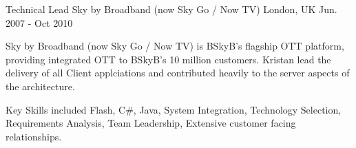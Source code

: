 \begin{cventries}

\cventry
{Technical Lead} %
{Sky by Broadband (now Sky Go / Now TV)} %
{London, UK} %
{Jun. 2007 - Oct 2010} %
{ %
\begin{cvitems}
\item {Sky by Broadband (now Sky Go / Now TV) is BSkyB's flagship OTT platform, providing integrated OTT to BSkyB's 10 million customers. Kristan lead the delivery of all Client applciations and contributed heavily to the server aspects of the architecture.}
\item {Key Skills included Flash, C\#, Java, System Integration, Technology Selection, Requirements Analysis, Team Leadership, Extensive customer facing relationships.}
\end{cvitems}
}


\end{cventries}
